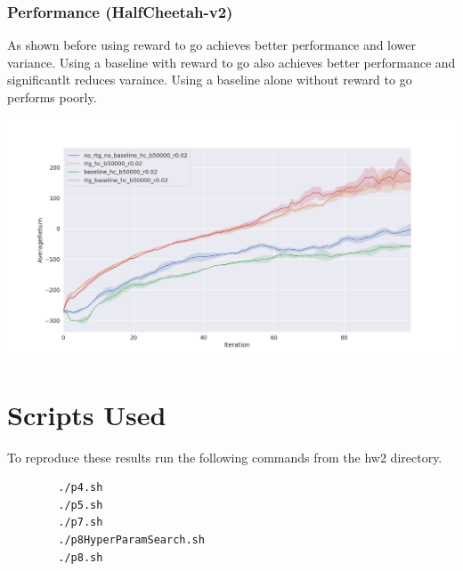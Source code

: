 \documentclass{article}
\begin{document}
    \subsubsection{ Performance (HalfCheetah-v2)}
    As shown before using reward to go achieves better performance and lower variance. Using a baseline with 
    reward to go also achieves better performance and significantlt reduces varaince. Using a baseline alone 
    without reward to go performs poorly.
    \begin{center}
        \noindent\includegraphics[scale=0.3]{cheetah}
    \end{center}

    \section{Scripts Used}

    To reproduce these results run the following commands from the hw2 directory.

    \begin{verbatim}
        ./p4.sh
        ./p5.sh
        ./p7.sh
        ./p8HyperParamSearch.sh
        ./p8.sh
    \end{verbatim}
\end{document}

